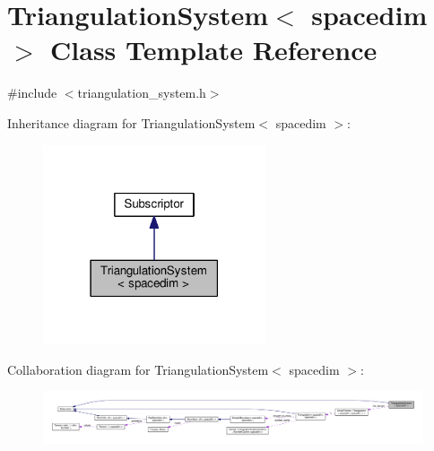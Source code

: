 \hypertarget{class_triangulation_system}{}\section{Triangulation\+System$<$ spacedim $>$ Class Template Reference}
\label{class_triangulation_system}


{\ttfamily \#include $<$triangulation\+\_\+system.\+h$>$}



Inheritance diagram for Triangulation\+System$<$ spacedim $>$\+:\nopagebreak
\begin{figure}[H]
\begin{center}
\leavevmode
\includegraphics[width=186pt]{class_triangulation_system__inherit__graph}
\end{center}
\end{figure}


Collaboration diagram for Triangulation\+System$<$ spacedim $>$\+:\nopagebreak
\begin{figure}[H]
\begin{center}
\leavevmode
\includegraphics[width=350pt]{class_triangulation_system__coll__graph}
\end{center}
\end{figure}

